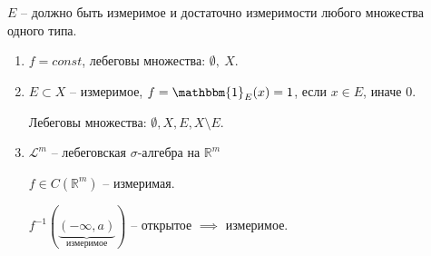 \begin{remark}
    $E$ -- должно быть измеримое и достаточно измеримости любого множества одного типа.    
\end{remark}

\begin{example}
    \begin{enumerate}
        \item {
            $f = const$, лебеговы множества: $\emptyset, \ X$.
        }
        \item {
            $E \subset X$ -- измеримое, $f = \mathbbm{1}_E(x) = 1$, если $x \in E$, иначе $0$.

            Лебеговы множества: $\emptyset, X, E, X \setminus E$.
        }
        \item {
            $\mathscr{L}^m$ -- лебеговская $\sigma$-алгебра на $\mathbb{R}^m$

            $f \in C(\mathbb{R}^m)$ -- измеримая.

            $f^{-1}(\underbrace{(-\infty, a)}_{\text{измеримое}})$ -- открытое $\implies$ измеримое.
        }
    \end{enumerate}
\end{example}


